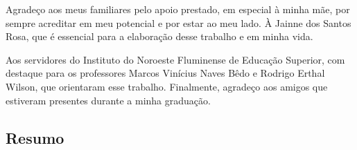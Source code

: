 Agradeço aos meus familiares pelo apoio prestado, em especial à minha mãe, por sempre acreditar em meu potencial e por estar ao meu lado.
À Jainne dos Santos Rosa, que é essencial para a elaboração desse trabalho e em minha vida.

Aos servidores do Instituto do Noroeste Fluminense de Educação Superior, com destaque para os professores Marcos Vinícius Naves Bêdo e Rodrigo Erthal Wilson, que orientaram esse trabalho.
Finalmente, agradeço aos amigos que estiveram presentes durante a minha graduação.


\newpage
\blankpage

\begin{center}
\section*{Resumo}
\end{center}

